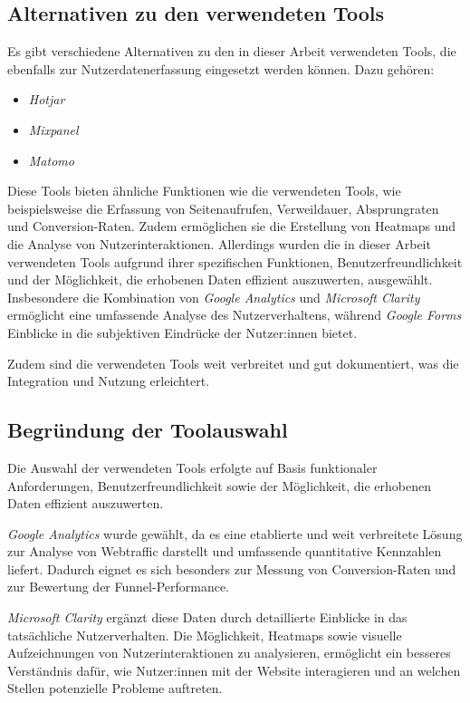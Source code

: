 \setauthor{\firstauthor}
\subsection{Alternativen zu den verwendeten Tools}

Es gibt verschiedene Alternativen zu den in dieser Arbeit verwendeten 
Tools, die ebenfalls zur Nutzerdatenerfassung eingesetzt werden können. 
Dazu gehören:

\begin{itemize}
    \item \textit{Hotjar}
    \item \textit{Mixpanel}
    \item \textit{Matomo}
\end{itemize}

Diese Tools bieten ähnliche Funktionen wie die verwendeten Tools, 
wie beispielsweise die Erfassung von Seitenaufrufen, Verweildauer, 
Absprungraten und Conversion-Raten. Zudem ermöglichen sie die Erstellung 
von Heatmaps und die Analyse von Nutzerinteraktionen.
Allerdings wurden die in dieser Arbeit verwendeten Tools aufgrund 
ihrer spezifischen Funktionen, Benutzerfreundlichkeit und der Möglichkeit, 
die erhobenen Daten effizient auszuwerten, ausgewählt. Insbesondere die 
Kombination von \textit{Google Analytics} und \textit{Microsoft Clarity} 
ermöglicht eine umfassende Analyse des Nutzerverhaltens, während 
\textit{Google Forms} Einblicke in die subjektiven Eindrücke 
der Nutzer:innen bietet.

Zudem sind die verwendeten Tools weit verbreitet und gut dokumentiert, was die
Integration und Nutzung erleichtert.

\setauthor{\firstauthor}
\subsection{Begründung der Toolauswahl}

Die Auswahl der verwendeten Tools erfolgte auf Basis funktionaler 
Anforderungen, Benutzerfreundlichkeit sowie der Möglichkeit, die 
erhobenen Daten effizient auszuwerten.

\textit{Google Analytics} wurde gewählt, da es eine etablierte und 
weit verbreitete Lösung zur Analyse von Webtraffic darstellt und 
umfassende quantitative Kennzahlen liefert. Dadurch eignet es sich 
besonders zur Messung von Conversion-Raten und zur Bewertung der 
Funnel-Performance.

\textit{Microsoft Clarity} ergänzt diese Daten durch detaillierte 
Einblicke in das tatsächliche Nutzerverhalten. Die Möglichkeit, 
Heatmaps sowie visuelle Aufzeichnungen von Nutzerinteraktionen zu analysieren, 
ermöglicht ein besseres Verständnis dafür, wie Nutzer:innen mit der 
Website interagieren und an welchen Stellen potenzielle Probleme auftreten.

